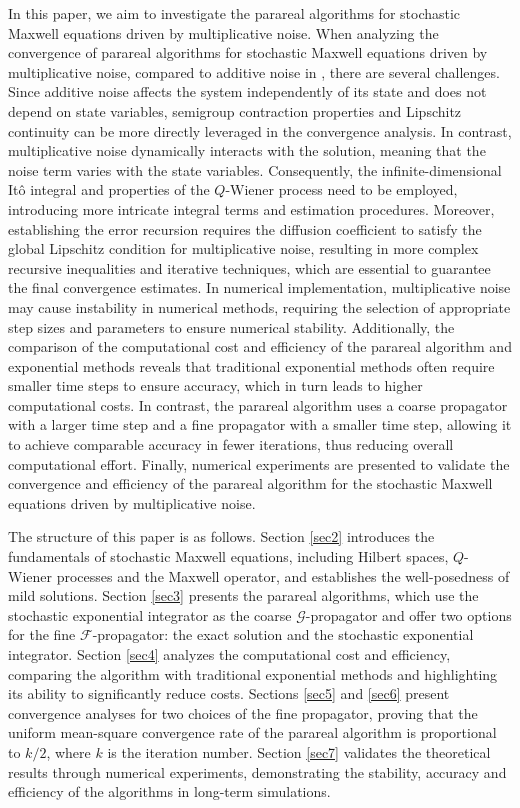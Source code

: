 \documentclass[preprint,12pt]{elsarticle}
\begin{document}
   In this paper, we aim to investigate the parareal algorithms for stochastic Maxwell equations driven by multiplicative noise. When analyzing the convergence of parareal algorithms for stochastic Maxwell equations driven by multiplicative noise, compared to additive noise in \citep{ZhangZhang}, there are several challenges. Since additive noise affects the system independently of its state and does not depend on state variables, semigroup contraction properties and Lipschitz continuity can be more directly leveraged in the convergence analysis. In contrast, multiplicative noise dynamically interacts with the solution, meaning that the noise term varies with the state variables. Consequently, the infinite-dimensional Itô integral and properties of the $Q$-Wiener process need to be employed, introducing more intricate integral terms and estimation procedures. Moreover, establishing the error recursion requires the diffusion coefficient to satisfy the global Lipschitz condition for multiplicative noise, resulting in more complex recursive inequalities and iterative techniques, which are essential to guarantee the final convergence estimates. In numerical implementation, multiplicative noise may cause instability in numerical methods, requiring the selection of appropriate step sizes and parameters to ensure numerical stability. Additionally, the comparison of the computational cost and efficiency of the parareal algorithm and exponential methods reveals that traditional exponential methods often require smaller time steps to ensure accuracy, which in turn leads to higher computational costs. In contrast, the parareal algorithm uses a coarse propagator with a larger time step and a fine propagator with a smaller time step, allowing it to achieve comparable accuracy in fewer iterations, thus reducing overall computational effort. Finally, numerical experiments are presented to validate the convergence and efficiency of the parareal algorithm for the stochastic Maxwell equations driven by multiplicative noise.
    
	The structure of this paper is as follows. Section \ref{sec2} introduces the fundamentals of stochastic Maxwell equations, including Hilbert spaces, \(Q\)-Wiener processes and the Maxwell operator, and establishes the well-posedness of mild solutions. Section \ref{sec3} presents the parareal algorithms, which use the stochastic exponential integrator as the coarse \( \mathcal{G} \)-propagator and offer two options for the fine \( \mathcal{F} \)-propagator: the exact solution and the stochastic exponential integrator. Section \ref{sec4} analyzes the computational cost and efficiency, comparing the algorithm with traditional exponential methods and highlighting its ability to significantly reduce costs. Sections \ref{sec5} and \ref{sec6} present convergence analyses for two choices of the fine propagator, proving that the uniform mean-square convergence rate of the parareal algorithm is proportional to \( k/2 \), where \( k \) is the iteration number. Section \ref{sec7} validates the theoretical results through numerical experiments, demonstrating the stability, accuracy and efficiency of the algorithms in long-term simulations.
	
\end{document}
